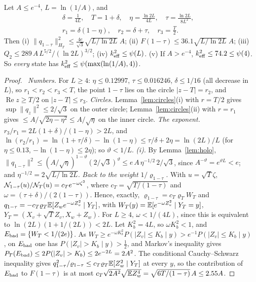 \begin{theorem}\label{thm:circles}
Let $A\le e^{-4}$, $L=\ln(1/A)$, and
\[
\begin{gathered}
\delta=\tfrac1{4L},\quad T=1+\delta,\quad \eta=\tfrac{\ln2L}{4L},\quad \tau=\tfrac{\ln2L}{8L^2},\\ r_1=\delta(1-\eta),\quad r_2=\delta+\tau,\quad r_3=\tfrac T2 .
\end{gathered}
\]
Then
(i) $\|q_{1-\tau}\|^2_{H_T}\le\frac{4e}{\sqrt3}\sqrt{L/\ln2L}\;A$;
(ii) $F(1-\tau)\le36.1\sqrt{L/\ln2L}\;A$;
(iii) $Q_2\le289\,A\,L^{5/2}/(\ln2L)^{3/2}$;
(iv) $k_{\mathrm{eff}}^2\le\psi(L)$.
(v) If $A>e^{-4}$, $k_{\mathrm{eff}}^2\le74.2\le\psi(4)$.
So \emph{every} state has $k_{\mathrm{eff}}^2\le\psi(\max(\ln(1/A),4))$.
\end{theorem}
\begin{proof}\proofst\
\emph{Numbers.} For $L\ge4$: $\eta\le0.12997$, $\tau\le0.016246$, $\delta\le1/16$ (all decrease in $L$), so $r_1<r_2<r_3<T$, the point $1-\tau$ lies on the circle $|z-T|=r_2$, and $\operatorname{Re}z\ge T/2$ on $|z-T|\le r_3$.
\emph{Circles.} Lemma~\ref{lem:circles}(i) with $r=T/2$ gives $\sup\|q_z\|^2\le2/\sqrt3$ on the outer circle; Lemma~\ref{lem:circles}(ii) with $r=r_1$ gives $\le A/\sqrt{2\eta-\eta^2}\le A/\sqrt\eta$ on the inner circle.
\emph{The exponent.} $r_3/r_1=2L(1+\delta)/(1-\eta)>2L$, and $\ln(r_2/r_1)=\ln(1+\tau/\delta)-\ln(1-\eta)\le\tau/\delta+2\eta=\ln(2L)/L$ (for $\eta\le0.13$, $-\ln(1-\eta)\le2\eta$); so $\vartheta<1/L$.
\emph{(i).} By Lemma~\ref{lem:holo}, $\|q_{1-\tau}\|^2\le(A/\sqrt\eta)^{1-\vartheta}(2/\sqrt3)^{\vartheta}\le e\,A\,\eta^{-1/2}\,2/\sqrt3$, since $A^{-\vartheta}=e^{\vartheta L}<e$; and $\eta^{-1/2}=2\sqrt{L/\ln2L}$.
\emph{Back to the weight $1/\varrho_{1-\tau}$.} With $u=\sqrt T\zeta$, $\mathcal N_{1-\tau}(u)/\mathcal N_T(u)=c_Te^{-\omega\zeta^2}$, where $c_T=\sqrt{T/(1-\tau)}$ and $\omega=(\tau+\delta)/(2(1-\tau))$.
Hence, exactly, $\varrho_{1-\tau}=c_T\varrho_TW_T$ and $q_{1-\tau}=-c_T\varrho_T\mathbb{E}[Z_we^{-\omega Z_v^2}\mid Y_T]$, with $W_T(y)=\mathbb{E}[e^{-\omega Z_v^2}\mid Y_T=y]$, $Y_T=(X_v+\sqrt TZ_v,X_w+Z_w)$.
For $L\ge4$, $\omega<1/(4L)$, since this is equivalent to $\ln(2L)(1+1/(2L))<2L$.
Let $K_b^2=4L$, so $\omega K_b^2<1$, and $E_{\rm bad}=\{W_T<1/(2e)\}$.
As $W_T\ge e^{-\omega K_b^2}P(|Z_v|\le K_b\mid y)>e^{-1}P(|Z_v|\le K_b\mid y)$, on $E_{\rm bad}$ one has $P(|Z_v|>K_b\mid y)>\frac12$, and Markov's inequality gives $P_T(E_{\rm bad})\le2P(|Z_v|>K_b)\le2e^{-2L}=2A^2$.
The conditional Cauchy--Schwarz inequality gives $q_{1-\tau}^2/\varrho_{1-\tau}\le c_T\varrho_T\mathbb{E}[Z_w^2\mid Y_T]$ at every $y$, so the contribution of $E_{\rm bad}$ to $F(1-\tau)$ is at most $c_T\sqrt{2A^2}\sqrt{\mathbb{E} Z_w^4}=\sqrt{6T/(1-\tau)}\,A\le2.55A$.

\end{proof}
